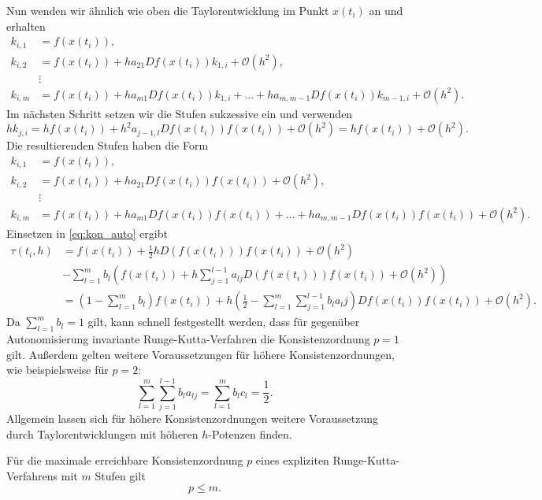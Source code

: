 Nun wenden wir ähnlich wie oben die Taylorentwicklung im Punkt $x(t_i)$ an und erhalten
\begin{align*}
    k_{i,1} &= f(x(t_i)), \\
    k_{i,2} &= f(x(t_i)) + ha_{21}Df(x(t_i))k_{1,i} + \mathcal{O}(h^2), \\
    &\vdots\\
    k_{i,m} &= f(x(t_i)) + ha_{m1}Df(x(t_i))k_{1,i} + \dots + ha_{m,m-1}Df(x(t_i))k_{m-1,i} + \mathcal{O}(h^2).
\end{align*}
Im nächsten Schritt setzen wir die Stufen sukzessive ein und verwenden
\[
    h k_{j,i} = hf(x(t_i)) + h^2 a_{j-1,l}Df(x(t_i))f(x(t_i)) + \mathcal{O}(h^2) = hf(x(t_i)) + \mathcal{O}(h^2).
\]
Die resultierenden Stufen haben die Form
\begin{align*}
    k_{i,1} &= f(x(t_i)), \\
    k_{i,2} &= f(x(t_i)) + ha_{21}Df(x(t_i))f(x(t_i)) + \mathcal{O}(h^2), \\
    &\vdots\\
    k_{i,m} &= f(x(t_i)) + ha_{m1}Df(x(t_i))f(x(t_i)) + \dots + ha_{m,m-1}Df(x(t_i))f(x(t_i)) + \mathcal{O}(h^2).
\end{align*}
Einsetzen in \eqref{eq:kon_auto} ergibt
\begin{align*}
    \tau(t_i,h) &= f(x(t_i)) + \frac{1}{2}hD(f(x(t_i)))f(x(t_i)) + \mathcal{O}(h^2) \\
    &- \sum_{l=1}^{m} b_l \left( f(x(t_i)) + h \sum_{j=1}^{l-1} a_{lj} D(f(x(t_i)))f(x(t_i)) + \mathcal{O}(h^2)\right)\\
    &= \left( 1 - \sum_{l=1}^{m} b_l  \right)f(x(t_i))
    + h \left( \frac{1}{2} - \sum_{l=1}^{m} \sum_{j=1}^{l-1} b_l a_lj \right) Df(x(t_i))f(x(t_i)) + \mathcal{O}(h^2).
\end{align*}
Da $\sum\limits_{l=1}^{m}b_l =1$ gilt, kann schnell festgestellt werden, dass für gegenüber Autonomisierung invariante
Runge-Kutta-Verfahren die Konsistenzordnung $p=1$ gilt. Außerdem gelten weitere Voraussetzungen für höhere
Konsistenzordnungen, wie beispielsweise für $p=2$:
\[
    \sum_{l=1}^{m} \sum_{j=1}^{l-1} b_l a_{lj} = \sum_{l=1}^{m} b_l c_l = \frac{1}{2}.
\]
Allgemein lassen sich für höhere Konsistenzordnungen weitere Voraussetzung durch Taylorentwicklungen mit höheren
$h$-Potenzen finden.
\newline
\begin{satz}[Butcherschranken]
    Für die maximale erreichbare Konsistenzordnung $p$ eines expliziten Runge-Kutta-Verfahrens mit $m$ Stufen gilt
    \[
        p \leq m.
    \]
\end{satz}
